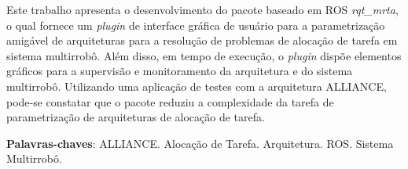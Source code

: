 \newpage
\begin{resumo}
    Este trabalho apresenta o desenvolvimento do pacote baseado em ROS \textit{rqt\_mrta}, o qual fornece um \textit{plugin} de interface gráfica de usuário para a parametrização amigável de arquiteturas para a resolução de problemas de alocação de tarefa em sistema multirrobô. Além disso, em tempo de execução, o \textit{plugin} dispõe elementos gráficos para a supervisão e monitoramento da arquitetura e do sistema multirrobô. Utilizando uma aplicação de testes com a arquitetura ALLIANCE, pode-se constatar que o pacote reduziu a complexidade da tarefa de parametrização de arquiteturas de alocação de tarefa.
    
    \vspace{\onelineskip}
    
    \noindent
    \textbf{Palavras-chaves}: ALLIANCE. Alocação de Tarefa. Arquitetura. ROS. Sistema Multirrobô. 
\end{resumo}
\newpage